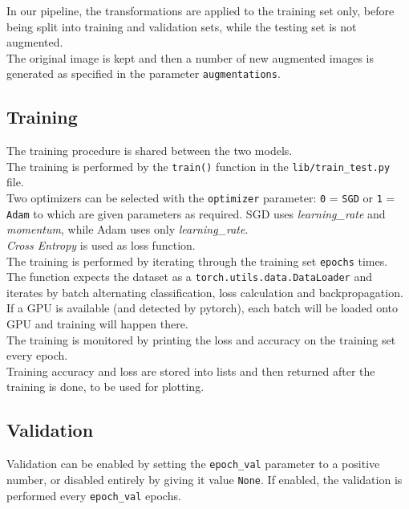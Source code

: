\documentclass{report}
\begin{document}
In our pipeline, the transformations are applied to the training set only, before being split into training and validation sets, while the testing set is not augmented. \\
The original image is kept and then a number of new augmented images is generated as specified in the parameter \texttt{augmentations}.\\

\subsection{Training}
The training procedure is shared between the two models. \\
The training is performed by the \texttt{train()} function in the \texttt{lib/train\_test.py} file. \\

Two optimizers can be selected with the \texttt{optimizer} parameter: \texttt{0} = \texttt{SGD} or \texttt{1} = \texttt{Adam} to which are given parameters
as required. SGD uses \textit{learning\_rate} and \textit{momentum}, while Adam uses only \textit{learning\_rate}. \\
\textit{Cross Entropy} is used as loss function. \\

The training is performed by iterating through the training set \texttt{epochs} times. \\
The function expects the dataset as a \texttt{torch.utils.data.DataLoader} and iterates by batch alternating classification, loss calculation and backpropagation.\\

If a GPU is available (and detected by pytorch), each batch will be loaded onto GPU and training will happen there. \\
The training is monitored by printing the loss and accuracy on the training set every epoch. \\
Training accuracy and loss are stored into lists and then returned after the training is done, to be used for plotting. \\

\subsection{Validation}
Validation can be enabled by setting the \texttt{epoch\_val} parameter to a positive number, or disabled entirely by giving it value \texttt{None}.
If enabled, the validation is performed every \texttt{epoch\_val} epochs. \\
\end{document}
